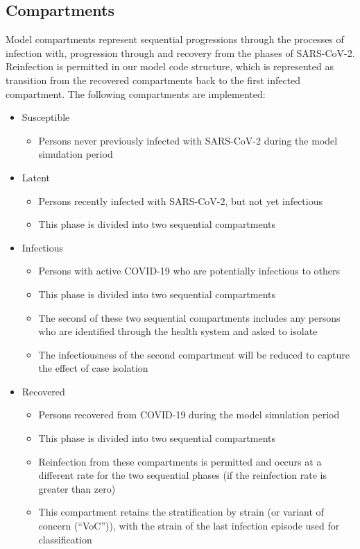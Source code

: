 \subsection{Compartments}
Model compartments represent sequential progressions through the processes of infection with, progression through and recovery from the phases of SARS-CoV-2.
Reinfection is permitted in our model code structure, which is represented as transition from the recovered compartments back to the first infected compartment.
The following compartments are implemented:
\begin{itemize}
    \item Susceptible
    \begin{itemize}
        \item Persons never previously infected with SARS-CoV-2 during the model simulation period
    \end{itemize}
    \item Latent
    \begin{itemize}
        \item Persons recently infected with SARS-CoV-2, but not yet infectious
        \item This phase is divided into two sequential compartments
    \end{itemize}
    \item Infectious
    \begin{itemize}
        \item Persons with active COVID-19 who are potentially infectious to others
        \item This phase is divided into two sequential compartments
        \item The second of these two sequential compartments includes any persons who are identified through the health system and asked to isolate
        \item The infectiousness of the second compartment will be reduced to capture the effect of case isolation
    \end{itemize}
    \item Recovered
    \begin{itemize}
        \item Persons recovered from COVID-19 during the model simulation period
        \item This phase is divided into two sequential compartments
        \item Reinfection from these compartments is permitted and occurs at a different rate for the two sequential phases (if the reinfection rate is greater than zero)
        \item This compartment retains the stratification by strain (or variant of concern (``VoC'')), with the strain of the last infection episode used for classification
    \end{itemize}
\end{itemize}
